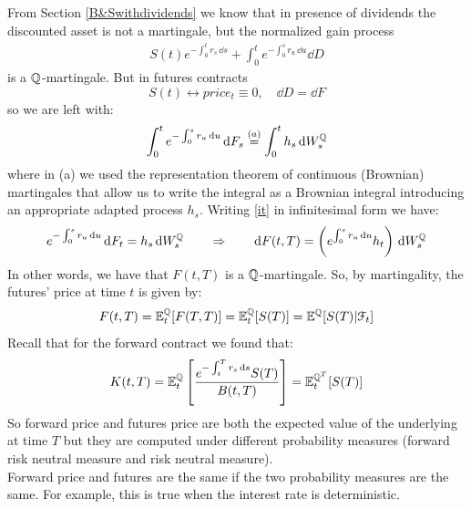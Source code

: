 From Section \ref{B&Swithdividends} we know that in presence of dividends the discounted asset is not a martingale, but the normalized gain process 
\begin{align}
    S(t)e^{-\int_0^t r_s\,\dd s} + \int_0^t e^{-\int_0^s r_u\,\dd u}\dd D
\end{align}
is a $\mathbb{Q}$-martingale. But in futures contracts 
\begin{equation*}
    S(t) \leftrightarrow price_t \equiv 0, \quad \dd D = \dd F
\end{equation*}
so we are left with:
\begin{align}\label{it}
    \int_0^t e^{-\int_0^s r_u\,\dd u}\,\dd F_s \overset{(a)}{=} \int_0^t h_s\,\dd W_s^{\mathbb{Q}}
\end{align}
where in (a) we used the representation theorem of continuous (Brownian) martingales that allow us to write the integral as a Brownian integral introducing an appropriate adapted process $h_s$. Writing \eqref{it} in infinitesimal form we have:
\begin{equation}
    e^{-\int_0^s r_u\,\dd u}\,\dd F_t = h_s\,\dd W_s^{\mathbb{Q}} \qquad\Rightarrow\qquad \dd F(t,T) = \left(e^{\int_0^s r_u\,\dd u}h_t\right)\,\dd W_s^{\mathbb{Q}}
\end{equation}
In other words, we have that $F(t,T)$ is a $\mathbb{Q}$-martingale. So, by martingality, the futures' price at time $t$ is given by:
\begin{equation}
    F(t,T) = \mathbb{E}^{\mathbb{Q}}_t[F(T,T)] = \mathbb{E}^{\mathbb{Q}}_t[S(T)] = \mathbb{E}^{\mathbb{Q}}[S(T)|\mathcal{F}_t] 
\end{equation}
Recall that for the forward contract we found that:
\begin{equation}
    K(t,T) = \mathbb{E}^{\mathbb{Q}}_t\left[\dfrac{e^{-\int_t^T r_s\,\dd s}S(T)}{B(t,T)}\right] = \mathbb{E}^{\mathbb{Q}^T}_t[S(T)]
\end{equation}
So forward price and futures price are both the expected value of the underlying at time $T$ but they are computed under different probability measures (forward risk neutral measure and risk neutral measure). \\
Forward price and futures are the same if the two probability measures are the same. For example, this is true when the interest rate is deterministic.

